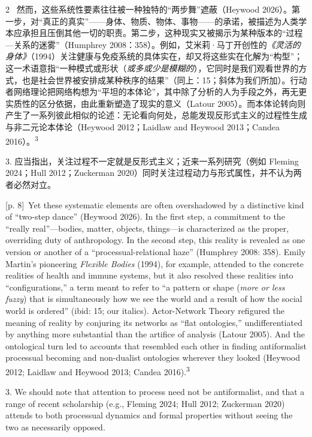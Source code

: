 \documentclass[10pt,a4paper]{article}
\begin{document}
\begin{paracol}{2}
\switchcolumn*
{\scriptsize\color{gray} [p. 8]}\ 然而，这些系统性要素往往被一种独特的“两步舞”遮蔽（Heywood 2026）。第一步，对“真正的真实”——身体、物质、物体、事物——的承诺，被描述为人类学本应承担且压倒其他一切的职责。第二步，这种现实又被揭示为某种版本的“过程—关系的迷雾”（Humphrey 2008：358）。例如，艾米莉·马丁开创性的\textit{《灵活的身体》}（1994）关注健康与免疫系统的具体实在，却又将这些实在化解为“构型”；这一术语意指“一种模式或形状（\textit{或多或少是模糊的}），它同时是我们观看世界的方式，也是社会世界被安排成某种秩序的结果”（同上：15；斜体为我们所加）。行动者网络理论把网络构想为“平坦的本体论”，其中除了分析的人为手段之外，再无更实质性的区分依据，由此重新塑造了现实的意义（Latour 2005）。而本体论转向则产生了一系列彼此相似的论述：无论看向何处，总能发现反形式主义的过程性生成与非二元论本体论（Heywood 2012；Laidlaw and Heywood 2013；Candea 2016）。\textsuperscript{3}\par{\small 3. 应当指出，关注过程不一定就是反形式主义；近来一系列研究（例如 Fleming 2024；Hull 2012；Zuckerman 2020）同时关注过程动力与形式属性，并不认为两者必然对立。\par}
\switchcolumn
{\scriptsize\color{gray} [p. 8]}\ Yet these systematic elements are often overshadowed by a distinctive kind of “two-step dance” (Heywood 2026). In the first step, a commitment to the “really real”—bodies, matter, objects, things—is characterized as the proper, overriding duty of anthropology. In the second step, this reality is revealed as one version or another of a “processual-relational haze” (Humphrey 2008: 358). Emily Martin’s pioneering \textit{Flexible Bodies} (1994), for example, attended to the concrete realities of health and immune systems, but it also resolved these realities into “configurations,” a term meant to refer to “a pattern or shape (\textit{more or less fuzzy}) that is simultaneously how we see the world and a result of how the social world is ordered” (ibid: 15; our italics). Actor-Network Theory refigured the meaning of reality by conjuring its networks as “flat ontologies,” undifferentiated by anything more substantial than the artifice of analysis (Latour 2005). And the ontological turn led to accounts that resembled each other in finding antiformalist processual becoming and non-dualist ontologies wherever they looked (Heywood 2012; Laidlaw and Heywood 2013; Candea 2016).\textsuperscript{3}\par{\small 3. We should note that attention to process need not be antiformalist, and that a range of recent scholarship (e.g., Fleming 2024; Hull 2012; Zuckerman 2020) attends to both processual dynamics and formal properties without seeing the two as necessarily opposed.\par}

\end{paracol}
\end{document}
